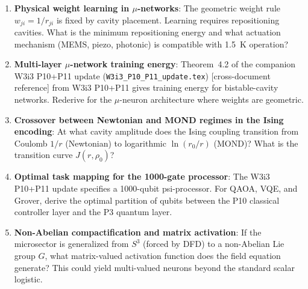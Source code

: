 \documentclass[11pt]{article}
\theoremstyle{definition}
\theoremstyle{remark}
\begin{document}
\begin{enumerate}
\item \textbf{Physical weight learning in $\mu$-networks}: The geometric
  weight rule $w_{ji} = 1/r_{ji}$ is fixed by cavity placement. Learning
  requires repositioning cavities. What is the minimum repositioning energy
  and what actuation mechanism (MEMS, piezo, photonic) is compatible with
  1.5~K operation?

\item \textbf{Multi-layer $\mu$-network training energy}: Theorem~4.2
  of the companion W3i3 P10+P11 update (\texttt{W3i3\_P10\_P11\_update.tex})
  [cross-document reference]
  from W3i3 P10+P11 gives training energy for bistable-cavity networks.
  Rederive for the $\mu$-neuron architecture where weights are geometric.

\item \textbf{Crossover between Newtonian and MOND regimes in the Ising
  encoding}: At what cavity amplitude does the Ising coupling transition
  from Coulomb $1/r$ (Newtonian) to logarithmic $\ln(r_0/r)$ (MOND)?
  What is the transition curve $J(r, \rho_0)$?

\item \textbf{Optimal task mapping for the 1000-gate processor}: The
  W3i3 P10+P11 update specifies a 1000-qubit psi-processor. For QAOA,
  VQE, and Grover, derive the optimal partition of qubits between the
  P10 classical controller layer and the P3 quantum layer.

\item \textbf{Non-Abelian compactification and matrix activation}: If
  the microsector is generalized from $S^3$ (forced by DFD) to a
  non-Abelian Lie group $G$, what matrix-valued activation function
  does the field equation generate? This could yield multi-valued
  neurons beyond the standard scalar logistic.
\end{enumerate}
\end{document}
